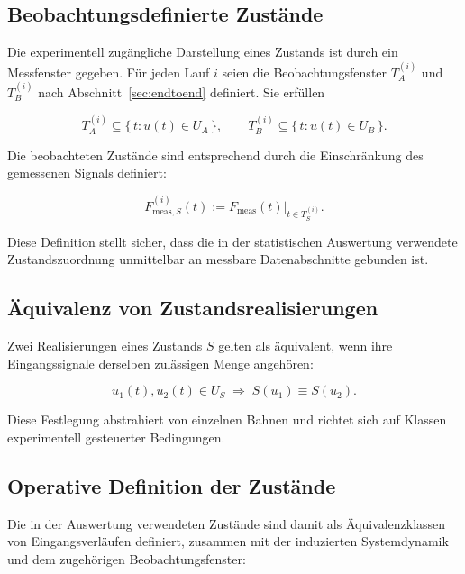 \documentclass[12pt,a4paper]{report}
\begin{document}
\subsection{Beobachtungsdefinierte Zustände}

Die experimentell zugängliche Darstellung eines Zustands ist durch ein
Messfenster gegeben. Für jeden Lauf $i$ seien die Beobachtungsfenster
$T_A^{(i)}$ und $T_B^{(i)}$ nach Abschnitt~\ref{sec:endtoend} definiert.
Sie erfüllen

\begin{equation}
T_A^{(i)} \subseteq \{\, t : u(t) \in U_A \,\},
\qquad
T_B^{(i)} \subseteq \{\, t : u(t) \in U_B \,\}.
\label{eq:fensterbedingung}
\end{equation}

Die beobachteten Zustände sind entsprechend durch die Einschränkung des
gemessenen Signals definiert:

\begin{equation}
F_{\mathrm{meas},S}^{(i)}(t) := F_{\mathrm{meas}}(t)\big|_{t \in T_S^{(i)}}.
\label{eq:beobzustand}
\end{equation}

Diese Definition stellt sicher, dass die in der statistischen Auswertung
verwendete Zustandszuordnung unmittelbar an messbare Datenabschnitte
gebunden ist.

\subsection{Äquivalenz von Zustandsrealisierungen}

Zwei Realisierungen eines Zustands $S$ gelten als äquivalent, wenn ihre
Eingangssignale derselben zulässigen Menge angehören:

\begin{equation}
u_1(t), u_2(t) \in U_S \;\Rightarrow\; S(u_1) \equiv S(u_2).
\label{eq:aequivalenz}
\end{equation}

Diese Festlegung abstrahiert von einzelnen Bahnen und richtet sich auf
Klassen experimentell gesteuerter Bedingungen.

\subsection{Operative Definition der Zustände}

Die in der Auswertung verwendeten Zustände sind damit als
Äquivalenzklassen von Eingangsverläufen definiert, zusammen mit der
induzierten Systemdynamik und dem zugehörigen Beobachtungsfenster:
\end{document}

